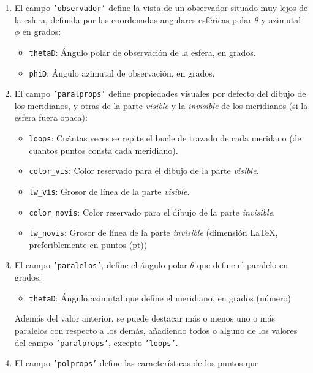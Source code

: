\begin{enumerate}
\item El campo \texttt{'observador'} define la vista de un observador situado muy lejos
  de la esfera, definida por las coordenadas angulares esféricas polar $\theta$ y
  azimutal $\phi$ en grados:
  \begin{itemize}
    \vspace*{-1ex}
  \item \texttt{thetaD}: Ángulo polar de observación de la esfera, en grados.
  \item \texttt{phiD}: Ángulo azimutal de observación, en grados.
  \end{itemize}
\item El campo \texttt{'paralprops'} define propiedades visuales por defecto del dibujo
  de los meridianos, y otras de la parte \emph{visible} y la \emph{invisible} de los
  meridianos (si la esfera fuera opaca):
  \begin{itemize}
    \vspace*{-1ex}
  \item \texttt{loops}: Cuántas veces se repite el bucle de trazado de cada meridano
    (de cuantos puntos consta cada meridiano).
  \item \texttt{color\_vis}: Color reservado para el dibujo de la parte \emph{visible}.
  \item \texttt{lw\_vis}: Grosor de línea de la parte \emph{visible}.
  \item \texttt{color\_novis}: Color reservado para el dibujo de la parte
    \emph{invisible}.
  \item \texttt{lw\_novis}: Grosor de línea de la parte \emph{invisible} (dimensión
    \LaTeX , preferiblemente en puntos (\unit{pt}))
  \end{itemize}  
\item El campo \texttt{'paralelos'}, define el ángulo polar $\theta$ que define el
  paralelo en grados:
  \begin{itemize}
    \vspace*{-1ex}
  \item \texttt{thetaD}: Ángulo azimutal que define el meridiano, en grados (número)
  \end{itemize}
  Además del valor anterior, se puede destacar más o menos uno o más paralelos
  con respecto a los demás, añadiendo todos o alguno de los valores del
  campo \texttt{'paralprops'}, excepto \texttt{'loops'}.
\item El campo \texttt{'polprops'} define las características de los puntos que

\end{enumerate}
